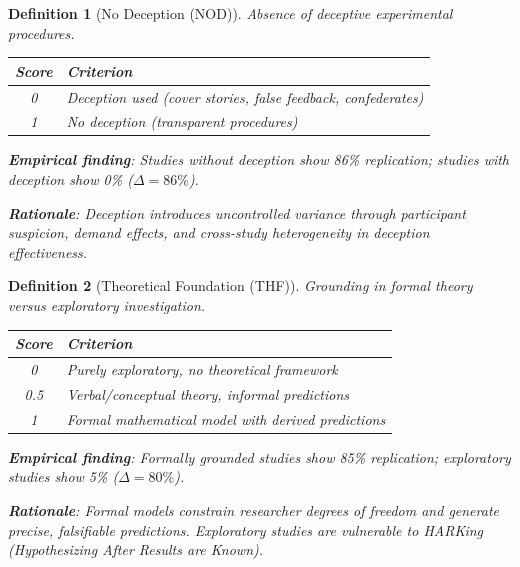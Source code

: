 \documentclass[11pt,a4paper]{article}
\newtheorem{definition}{Definition}[section]
\begin{document}
\begin{definition}[No Deception (NOD)]
\label{def:nod}
Absence of deceptive experimental procedures.

\begin{center}
\begin{tabular}{cl}
\toprule
\textbf{Score} & \textbf{Criterion} \\
\midrule
0 & Deception used (cover stories, false feedback, confederates) \\
1 & No deception (transparent procedures) \\
\bottomrule
\end{tabular}
\end{center}

\textbf{Empirical finding}: Studies without deception show 86\% replication; studies with deception show 0\% ($\Delta = 86\%$).

\textbf{Rationale}: Deception introduces uncontrolled variance through participant suspicion, demand effects, and cross-study heterogeneity in deception effectiveness.
\end{definition}

\begin{definition}[Theoretical Foundation (THF)]
\label{def:thf}
Grounding in formal theory versus exploratory investigation.

\begin{center}
\begin{tabular}{cl}
\toprule
\textbf{Score} & \textbf{Criterion} \\
\midrule
0 & Purely exploratory, no theoretical framework \\
0.5 & Verbal/conceptual theory, informal predictions \\
1 & Formal mathematical model with derived predictions \\
\bottomrule
\end{tabular}
\end{center}

\textbf{Empirical finding}: Formally grounded studies show 85\% replication; exploratory studies show 5\% ($\Delta = 80\%$).

\textbf{Rationale}: Formal models constrain researcher degrees of freedom and generate precise, falsifiable predictions. Exploratory studies are vulnerable to HARKing (Hypothesizing After Results are Known).
\end{definition}
\end{document}

